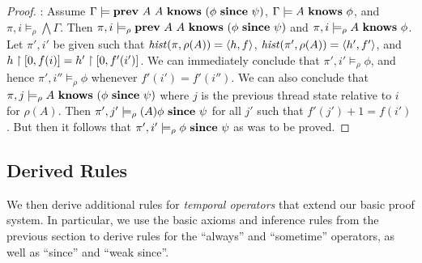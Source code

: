 \begin{proof}
\noindent{}: Assume $\Gamma \models \mathbf{prev}\ A\ A\ \mathbf{knows}\ (\phi\ \mathbf{since}\ \psi)$,
$ \Gamma\models  A\ \mathbf{knows}\ \phi$,  and $\pi,i\models_\rho \bigwedge\Gamma$. Then 
$\pi,i \models_\rho  \Prev\ A\ A\ \Knows\ (\phi\ \Since\ \psi)$
and $\pi,i \models_\rho  A\ \mathbf{knows}\ \phi$. Let $\pi',i'$ be given such that
$\mathit{hist}(\pi,\rho(A)) = \langle h,f\rangle$, $\mathit{hist}(\pi',\rho(A)) = \langle h',f'\rangle$, and $h\upharpoonright [0,f(i)] =
h'\upharpoonright[0,f'(i')]$. We can immediately conclude that $\pi',i'\models_\rho \phi$, and hence $\pi',i''\models_\rho \phi$
whenever $f'(i') = f'(i'')$. We can also conclude that $\pi,j \models_\rho A\ \mathbf{knows}\ (\phi\ \mathbf{since}\ \psi)$ where $j$ is the previous
thread state relative to $i$ for $\rho(A)$. Then $\pi',j'\models_\rho(A)  \phi\ \Since\ \psi$ for all $j'$ such that $f'(j')+1 = f(i')$.
But then it follows that $\pi',i'\models_\rho \phi\ \mathbf{since}\ \psi$ as was to be proved.
\end{proof}
%
\subsection{Derived Rules}
We then derive additional rules for \textit{temporal operators} that extend our basic proof system. In particular, we use the basic axioms and inference rules from the previous section to derive rules for the ``always'' and ``sometime'' operators, as well as ``since'' and ``weak since''. 

